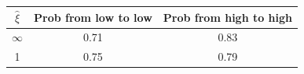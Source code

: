 \begin{tabular}{ccc}
\hline
\rule{0pt}{1.2em}
$\widehat \xi$  &Prob from low to low& Prob from high to high \\
\hline
$\infty$ &  0.71 & 0.83 \\
1   &  0.75 & 0.79  \\



\hline
\end{tabular}
